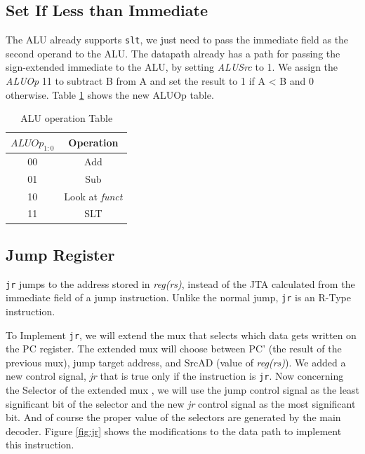 \documentclass[titlepage,12pt,oneside,a4paper]{article}
\newcommand{\code}[1]{{\texttt{#1}}}
\begin{document}
\subsection{Set If Less than Immediate}
The ALU already supports \code{slt}, we just need to pass the immediate field as the second operand to the ALU. The datapath already has a path for passing the sign-extended immediate to the ALU, by setting \textit{ALUSrc} to 1. We assign the \textit{ALUOp} 11 to subtract B from A and set the result to 1 if A \textless{ } B and 0 otherwise. Table \ref{table:aluop} shows the new ALUOp table.

\begin{table}
	\begin{center}
		\begin{tabular}{|c|c|}
			\hline
			$ALUOp_{1:0}$ & Operation \\
			\hline
			00 & Add \\
			01 & Sub \\
			10 & Look at \textit{funct} \\
			11 & SLT \\
			\hline
		\end{tabular}
	\end{center}
	\caption{ALU operation Table}
	\label{table:aluop}
\end{table}

\subsection{Jump Register}
\code{jr} jumps to the address stored in \textit{reg(rs)}, instead of the JTA calculated from the immediate field of a jump instruction. Unlike the normal jump, \code{jr} is an R-Type instruction.

To Implement \code{jr}, we will extend the mux that selects which data gets written on the PC register. The extended mux will choose between PC’ (the result of the previous mux), jump target address, and SrcAD (value of \textit{reg(rs)}). We added a new control signal, \textit{jr} that is true only if the instruction is \code{jr}. Now concerning the Selector of the extended mux , we will use the jump control signal as the least significant bit of the selector and the new \textit{jr} control signal as the most significant bit. And of course the proper value of the selectors are generated by the main decoder. Figure \ref{fig:jr} shows the modifications to the data path to implement this instruction.
\end{document}
